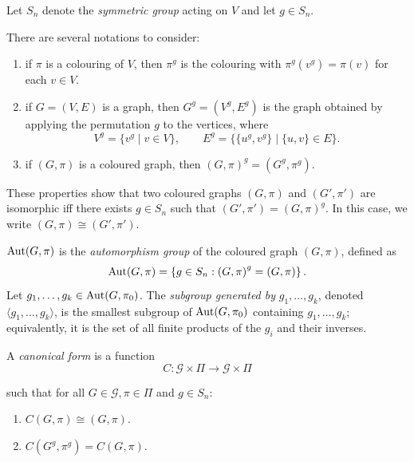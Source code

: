\begin{definition}\label{def: action group/automorphism group}
Let \emph{$S_n$} denote the \emph{symmetric group} acting on $V$ and let $g \in S_n$.

There are several notations to consider:
    \begin{enumerate}
        \item if $\pi$ is a colouring of $V$, then $\pi^g$ is the colouring with $\pi^g (v^g) =
        \pi(v)$ for each $v \mathrel{\in}V$.
        \item if $G=(V,E)$ is a graph, then $G^g=(V^g,E^g)$ is the graph obtained by applying the permutation $g$ to the vertices, where
\[
V^g=\{v^g\mid v\in V\}, \qquad
E^g=\{\{u^g,v^g\}\mid \{u,v\}\in E\}.
\]
        \item if $ (G,\pi)$ is a coloured graph, then $ {(G,\pi)}^g = (G^g,\pi^g)$.
    \end{enumerate}

These properties show that two coloured graphs $ (G, \pi)$ and $ (G', \pi')$ are isomorphic iff there exists $g \mathrel{\in}S_n$ such that $ (G', \pi') = {(G, \pi)}^g$. In this case, we write $ (G, \pi) \cong(G', \pi')$.


$\operatorname{Aut}(G,\pi)$ is the \emph{automorphism group} of the coloured graph $(G,\pi)$, defined as
\[
\operatorname{Aut}(G,\pi)=\left\{g\in S_n : {(G,\pi)}^g=(G,\pi)\right\}.
\]
Let $g_1,\ldots,g_k \in \operatorname{Aut}(G,\pi_0)$. The \emph{subgroup generated by} $g_1,\ldots,g_k$, 
denoted $\langle g_1,\ldots,g_k\rangle$, is the smallest subgroup of $\operatorname{Aut}(G,\pi_0)$ containing 
$g_1,\ldots,g_k$; equivalently, it is the set of all finite products of the $g_i$ and their 
inverses.

\end{definition}

\vspace{1em}

\begin{definition}\label{def:canonical form}

A \emph{canonical form} is a function
\[
C : \mathcal{G} \times \Pi \to \mathcal{G} \times \Pi
\]


such that for all  $G \mathrel{\in}\mathcal{G},  \pi\mathrel{\in}\Pi$ and  $g \mathrel{\in}S_n$:

\begin{enumerate}
    \item $C (G,\pi) \cong(G,\pi)$. 
    \item $C (G^g,\pi^g) = C (G,\pi)$.
\end{enumerate}
\end{definition}



